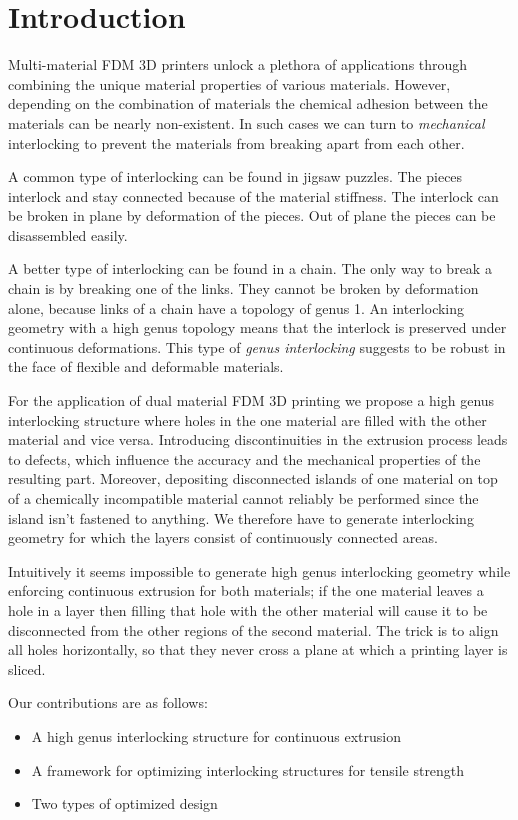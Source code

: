 \section{Introduction}
Multi-material FDM 3D printers unlock a plethora of applications through combining the unique material properties of various materials.
However, depending on the combination of materials the chemical adhesion between the materials can be nearly non-existent.
In such cases we can turn to \emph{mechanical} interlocking to prevent the materials from breaking apart from each other.

A common type of interlocking can be found in jigsaw puzzles.
The pieces interlock and stay connected because of the material stiffness.
The interlock can be broken in plane by deformation of the pieces.
Out of plane the pieces can be disassembled easily.

A better type of interlocking can be found in a chain.
The only way to break a chain is by breaking one of the links.
They cannot be broken by deformation alone, because links of a chain have a topology of genus 1.
An interlocking geometry with a high genus topology means that the interlock is preserved under continuous deformations.
This type of \emph{genus interlocking} suggests to be robust in the face of flexible and deformable materials.

For the application of dual material FDM 3D printing we propose a high genus interlocking structure where holes in the one material are filled with the other material and vice versa.
Introducing discontinuities in the extrusion process leads to defects, which influence the accuracy and the mechanical properties of the resulting part.
Moreover, depositing disconnected islands of one material on top of a chemically incompatible material cannot reliably be performed since the island isn't fastened to anything.
We therefore have to generate interlocking geometry for which the layers consist of continuously connected areas.

Intuitively it seems impossible to generate high genus interlocking geometry while enforcing continuous extrusion for both materials;
if the one material leaves a hole in a layer then filling that hole with the other material will cause it to be disconnected from the other regions of the second material.
The trick is to align all holes horizontally, so that they never cross a plane at which a printing layer is sliced.



Our contributions are as follows:
\begin{itemize}
	\item A high genus interlocking structure for continuous extrusion
	\item A framework for optimizing interlocking structures for tensile strength
	\item Two types of optimized design
\end{itemize}










